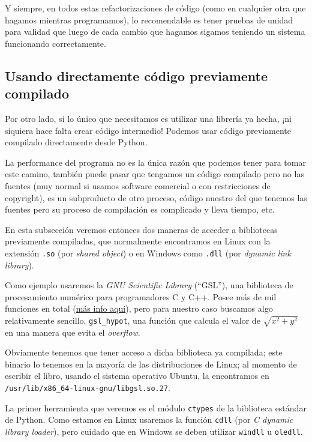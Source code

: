 Y siempre, en todos estas refactorizaciones de código (como en cualquier otra que hagamos mientras programamos), lo recomendable es tener pruebas de unidad para validad que luego de cada cambio que hagamos sigamos teniendo un sistema funcionando correctamente.


\subsection{Usando directamente código previamente compilado}

Por otro lado, si lo único que necesitamos es utilizar una librería ya hecha, ¡ni siquiera hace falta crear código intermedio! Podemos usar código previamente compilado directamente desde Python.

La performance del programa no es la única razón que podemos tener para tomar este camino, también puede pasar que tengamos un código compilado pero no las fuentes (muy normal si usamos software comercial o con restricciones de copyright), es un subproducto de otro proceso, código nuestro del que tenemos las fuentes pero su proceso de compilación es complicado y lleva tiempo, etc.

En esta subsección veremos entonces dos maneras de acceder a bibliotecas previamente compiladas, que normalmente encontramos en Linux con la extensión \texttt{.so} (por \textit{shared object}) o en Windows como \texttt{.dll} (por \textit{dynamic link library}).

Como ejemplo usaremos la \textit{GNU Scientific Library} (``GSL''), una biblioteca de procesamiento numérico para programadores C y C++. Posee más de mil funciones en total (\href{https://www.gnu.org/software/gsl/#subjects}{más info aquí}), pero para nuestro caso buscamos algo relativamente sencillo, \texttt{gsl\_hypot}, una función que calcula el valor de $\sqrt{x^2 + y^2}$ en una manera que evita el \textit{overflow}.

Obviamente tenemos que tener acceso a dicha biblioteca ya compilada; este binario lo tenemos en la mayoría de las distribuciones de Linux; al momento de escribir el libro, usando el sistema operativo Ubuntu, la encontramos en \texttt{/usr/lib/x86\_64-linux-gnu/libgsl.so.27}.

La primer herramienta que veremos es el módulo \texttt{ctypes} de la biblioteca estándar de Python. Como estamos en Linux usaremos la función \texttt{cdll} (por \textit{C dynamic library loader}), pero cuidado que en Windows se deben utilizar \texttt{windll} u \texttt{oledll}.

